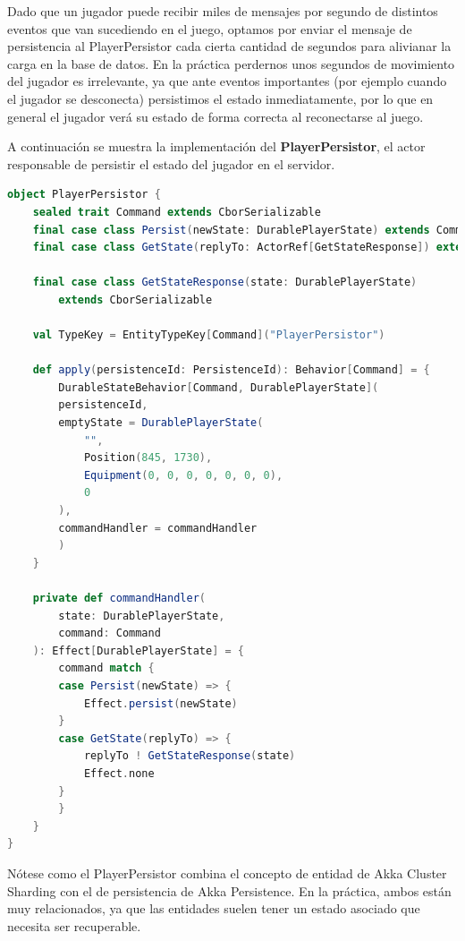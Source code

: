 Dado que un jugador puede recibir miles de mensajes por segundo de distintos eventos que van sucediendo en el juego, optamos por enviar el mensaje de persistencia al
PlayerPersistor cada cierta cantidad de segundos para alivianar la carga en la base de datos. En la práctica perdernos unos segundos de movimiento del jugador es irrelevante, ya que ante eventos
importantes (por ejemplo cuando el jugador se desconecta) persistimos el estado inmediatamente, por lo que en general el jugador verá su estado de forma correcta
al reconectarse al juego.

A continuación se muestra la implementación del \textbf{PlayerPersistor}, el actor responsable de persistir el estado del jugador en el servidor.

\begin{lstlisting}[language=Scala, caption={\textbf{Implementación del PlayerPersistor}}]
object PlayerPersistor {
    sealed trait Command extends CborSerializable
    final case class Persist(newState: DurablePlayerState) extends Command
    final case class GetState(replyTo: ActorRef[GetStateResponse]) extends Command
    
    final case class GetStateResponse(state: DurablePlayerState)
        extends CborSerializable
    
    val TypeKey = EntityTypeKey[Command]("PlayerPersistor")
    
    def apply(persistenceId: PersistenceId): Behavior[Command] = {
        DurableStateBehavior[Command, DurablePlayerState](
        persistenceId,
        emptyState = DurablePlayerState(
            "",
            Position(845, 1730),
            Equipment(0, 0, 0, 0, 0, 0, 0),
            0
        ),
        commandHandler = commandHandler
        )
    }
    
    private def commandHandler(
        state: DurablePlayerState,
        command: Command
    ): Effect[DurablePlayerState] = {
        command match {
        case Persist(newState) => {
            Effect.persist(newState)
        }
        case GetState(replyTo) => {
            replyTo ! GetStateResponse(state)
            Effect.none
        }
        }
    }
}
\end{lstlisting}

Nótese como el PlayerPersistor combina el concepto de entidad de Akka Cluster Sharding con el de persistencia de Akka Persistence. En la práctica, ambos están muy relacionados,
ya que las entidades suelen tener un estado asociado que necesita ser recuperable.

